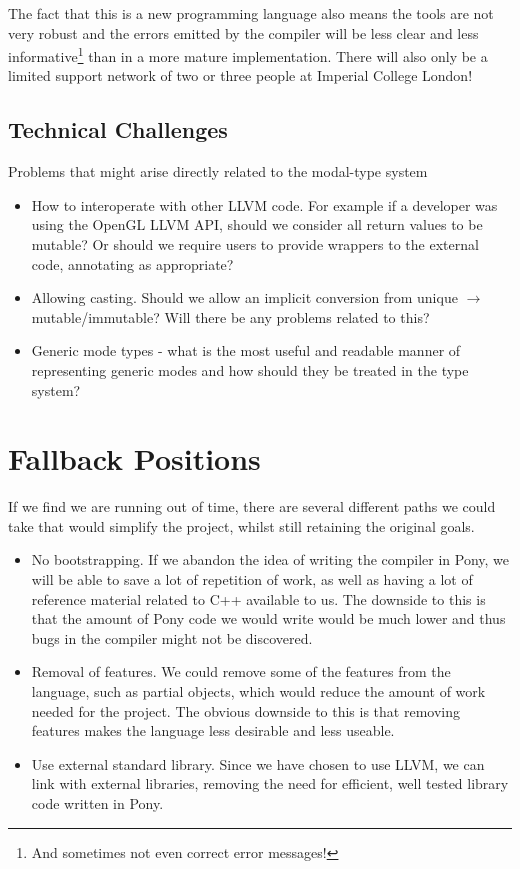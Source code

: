 \documentclass[11pt,a4paper]{report}
\begin{document}
The fact that this is a new programming language also means the tools are not very robust and the errors emitted by the compiler will be less clear and less informative\footnote{And sometimes not even correct error messages!} than in a more mature implementation.
There will also only be a limited support network of two or three people at Imperial College London!

\subsection{Technical Challenges}

Problems that might arise directly related to the modal-type system
	\begin{itemize}
		\item How to interoperate with other LLVM code. For example if a developer was using the OpenGL LLVM API, should we consider all return values to be mutable?
			Or should we require users to provide wrappers to the external code, annotating as appropriate?
		\item Allowing casting. Should we allow an implicit conversion from unique $\to$ mutable/immutable?
			Will there be any problems related to this?
		\item Generic mode types - what is the most useful and readable manner of representing generic modes and how should they be treated in the type system?
	\end{itemize}
	
\section{Fallback Positions}
If we find we are running out of time, there are several different paths we could take that would simplify the project, whilst still retaining the original goals.
\begin{itemize}[noitemsep]
	\item No bootstrapping.
		If we abandon the idea of writing the compiler in Pony, we will be able to save a lot of repetition of work, as well as having a lot of reference material related to C++ available to us.
		The downside to this is that the amount of Pony code we would write would be much lower and thus bugs in the compiler might not be discovered.
	\item Removal of features.
		We could remove some of the features from the language, such as partial objects, which would reduce the amount of work needed for the project.
		The obvious downside to this is that removing features makes the language less desirable and less useable.
	\item Use external standard library.
		 Since we have chosen to use LLVM, we can link with external libraries, removing the need for efficient, well tested library code written in Pony.
\end{itemize}
\end{document}
